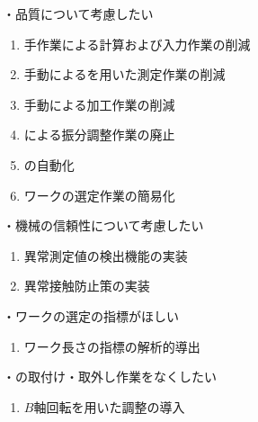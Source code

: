 \clearpage
・品質について考慮したい
\begin{enumerate}[label=\sarrow]
\item 手作業による計算および入力作業の削減
\item 手動による\TouchSensorProbe を用いた測定作業の削減
\item 手動による加工作業の削減
\item \Spacer による振分調整作業の廃止
\item \CurvedOutcutMilling の自動化
\item ワーク\FixtureBolt の選定作業の簡易化
\end{enumerate}



・機械の信頼性について考慮したい
\begin{enumerate}[label=\sarrow]
\item 異常測定値の検出機能の実装
\item 異常接触防止策の実装
\end{enumerate}



・ワーク\FixtureBolt の選定の指標がほしい
\begin{enumerate}[label=\sarrow]
\item ワーク\FixtureBolt 長さの指標の解析的導出
\end{enumerate}
・\Spacer の取付け・取外し作業をなくしたい
\begin{enumerate}[label=\sarrow]
\item $B$軸回転を用いた\AlocationLength 調整の導入
\end{enumerate}



